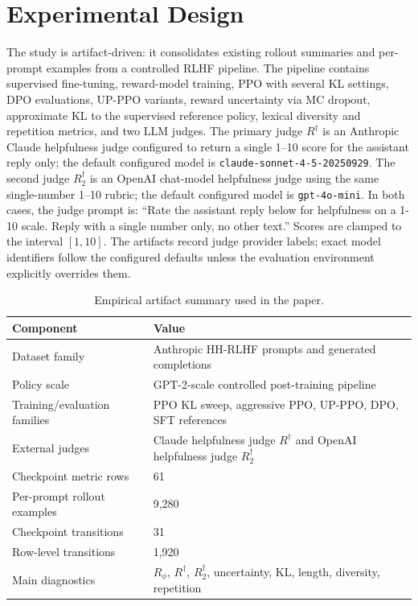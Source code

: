 \documentclass[11pt]{article}
\newcommand{\Rphi}{R_{\phi}}
\newcommand{\Rdag}{R^{\dagger}}
\newcommand{\Rtwo}{R^{\dagger}_2}
\begin{document}
\section{Experimental Design}
The study is artifact-driven: it consolidates existing rollout summaries and per-prompt examples from a controlled RLHF pipeline. The pipeline contains supervised fine-tuning, reward-model training, PPO with several KL settings, DPO evaluations, UP-PPO variants, reward uncertainty via MC dropout, approximate KL to the supervised reference policy, lexical diversity and repetition metrics, and two LLM judges. The primary judge $\Rdag$ is an Anthropic Claude helpfulness judge configured to return a single 1--10 score for the assistant reply only; the default configured model is \texttt{claude-sonnet-4-5-20250929}. The second judge $\Rtwo$ is an OpenAI chat-model helpfulness judge using the same single-number 1--10 rubric; the default configured model is \texttt{gpt-4o-mini}. In both cases, the judge prompt is: ``Rate the assistant reply below for helpfulness on a 1-10 scale. Reply with a single number only, no other text.'' Scores are clamped to the interval $[1,10]$. The artifacts record judge provider labels; exact model identifiers follow the configured defaults unless the evaluation environment explicitly overrides them.

\begin{table}[t]
\centering
\small
\caption{Empirical artifact summary used in the paper.}
\label{tab:artifact-summary}
\begin{tabular}{ll}
\toprule
Component & Value \\
\midrule
Dataset family & Anthropic HH-RLHF prompts and generated completions \\
Policy scale & GPT-2-scale controlled post-training pipeline \\
Training/evaluation families & PPO KL sweep, aggressive PPO, UP-PPO, DPO, SFT references \\
External judges & Claude helpfulness judge $\Rdag$ and OpenAI helpfulness judge $\Rtwo$ \\
Checkpoint metric rows & 61 \\
Per-prompt rollout examples & 9,280 \\
Checkpoint transitions & 31 \\
Row-level transitions & 1,920 \\
Main diagnostics & $\Rphi$, $\Rdag$, $\Rtwo$, uncertainty, KL, length, diversity, repetition \\
\bottomrule
\end{tabular}
\end{table}
\end{document}
